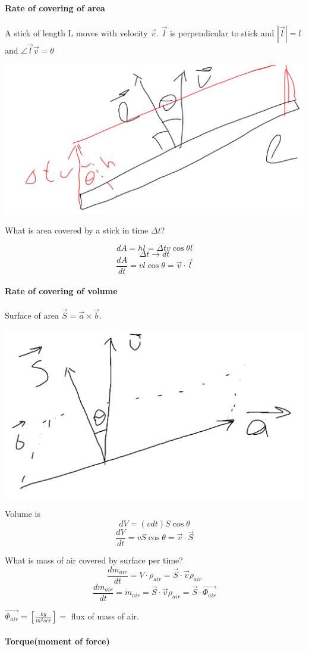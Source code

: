 \paragraph{Rate of covering of area}A stick of length L moves with velocity $\vec{v}$. $\vec{l}$ is perpendicular to stick and $| \vec{l} | = l$ and $\angle\vec{l}\vec{v}=\theta$


\begin{center}
	\includegraphics[width=0.4\linewidth]{./lect3/pic1.png}
\end{center}

What is area covered by a stick in time $\Delta t$?

$$dA = hl = \Delta tv \cos \theta l $$
$$\Delta t \rightarrow dt $$
$$\frac{dA}{dt} = vl \cos \theta = \vec{v} \cdot \vec{l}$$

\paragraph{Rate of covering of volume} Surface of area $\vec{S} = \vec{a} \times \vec{b}$.

\begin{center}
	\includegraphics[width=0.3\linewidth]{./lect3/pic2.png}
\end{center}

Volume is 
$$dV = (vdt) S \cos \theta $$
$$\frac{dV}{dt} = vS \cos \theta = \vec{v} \cdot \vec{S}$$


What is mass of air covered by surface per time?
$$\frac{d m_{air}}{dt}= V \cdot \rho_{air} = \vec{S} \cdot \vec{v} \rho_{air} $$
$$\frac{d m_{air}}{dt} = \dot{m}_{air} = \vec{S} \cdot \vec{v} \rho_{air} = \vec{S} \cdot \vec{\Phi_{air}}$$

$\vec{\Phi_{air}}= \left[\frac{kg}{m^2 sec}\right] =$ flux of mass of air.


\paragraph{Torque(moment of force)}


